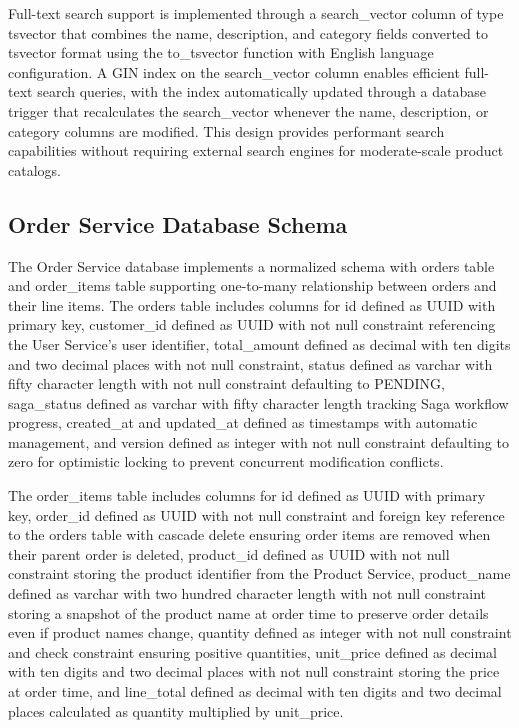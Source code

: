 Full-text search support is implemented through a search\_vector column of type tsvector that combines the name, description, and category fields converted to tsvector format using the to\_tsvector function with English language configuration. A GIN index on the search\_vector column enables efficient full-text search queries, with the index automatically updated through a database trigger that recalculates the search\_vector whenever the name, description, or category columns are modified. This design provides performant search capabilities without requiring external search engines for moderate-scale product catalogs.

\subsection{Order Service Database Schema}

The Order Service database implements a normalized schema with orders table and order\_items table supporting one-to-many relationship between orders and their line items. The orders table includes columns for id defined as UUID with primary key, customer\_id defined as UUID with not null constraint referencing the User Service's user identifier, total\_amount defined as decimal with ten digits and two decimal places with not null constraint, status defined as varchar with fifty character length with not null constraint defaulting to PENDING, saga\_status defined as varchar with fifty character length tracking Saga workflow progress, created\_at and updated\_at defined as timestamps with automatic management, and version defined as integer with not null constraint defaulting to zero for optimistic locking to prevent concurrent modification conflicts.

The order\_items table includes columns for id defined as UUID with primary key, order\_id defined as UUID with not null constraint and foreign key reference to the orders table with cascade delete ensuring order items are removed when their parent order is deleted, product\_id defined as UUID with not null constraint storing the product identifier from the Product Service, product\_name defined as varchar with two hundred character length with not null constraint storing a snapshot of the product name at order time to preserve order details even if product names change, quantity defined as integer with not null constraint and check constraint ensuring positive quantities, unit\_price defined as decimal with ten digits and two decimal places with not null constraint storing the price at order time, and line\_total defined as decimal with ten digits and two decimal places calculated as quantity multiplied by unit\_price.

